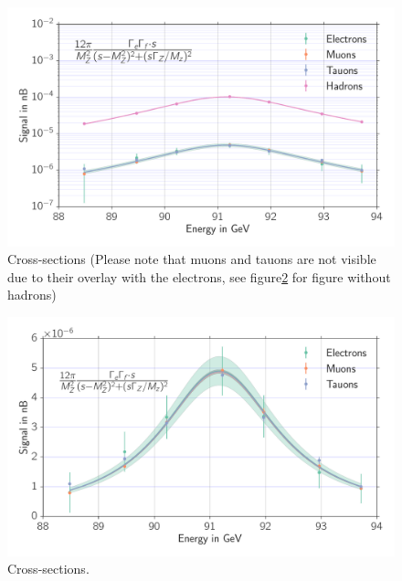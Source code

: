 \begin{figure}[htpb]
    \centering
    \includegraphics[width=1.0\linewidth]{figures/crosssections}
    \caption{Cross-sections (Please note that muons and tauons are not visible due to their overlay with the electrons,
    see figure\ref{fig:crosssections2} for figure without hadrons)}
    \label{fig:crosssections}
\end{figure}


\begin{figure}[htpb]
    \centering
    \includegraphics[width=1.0\linewidth]{figures/crosssections2}
    \caption{Cross-sections.}
    \label{fig:crosssections2}
\end{figure}

